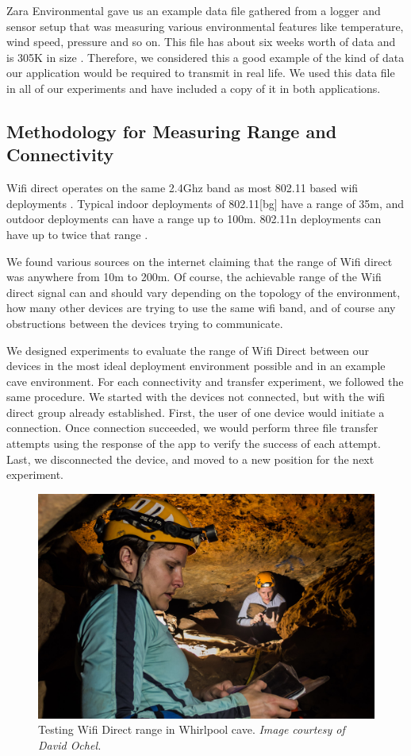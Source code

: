 \documentclass[10pt,twocolumn]{article}
\begin{document}
Zara Environmental gave us an example data file gathered from a logger and sensor setup that was measuring various environmental features like temperature, wind speed, pressure and so on.
This file has about six weeks worth of data and is 305K in size \cite{datafile}.
Therefore, we considered this a good example of the kind of data our application would be required to transmit in real life.
We used this data file in all of our experiments and have included a copy of it in both applications.

\subsection{Methodology for Measuring Range and Connectivity}
Wifi direct operates on the same 2.4Ghz band as most 802.11 based wifi deployments \cite{wifiwhitepaper}.
Typical indoor deployments of 802.11[bg] have a range of 35m, and outdoor deployments can have a range up to 100m.
802.11n deployments can have up to twice that range \cite{wikiwifi}.

We found various sources on the internet claiming that the range of Wifi direct was anywhere from 10m to 200m. 
Of course, the achievable range of the Wifi direct signal can and should vary depending on the topology of the environment, how many other devices are trying to use the same wifi band, and of course any obstructions between the devices trying to communicate.

We designed experiments to evaluate the range of Wifi Direct between our devices in the most ideal deployment environment possible and in an example cave environment.
For each connectivity and transfer experiment, we followed the same procedure. 
We started with the devices not connected, but with the wifi direct group already established.
First, the user of one device would initiate a connection.
Once connection succeeded, we would perform three file transfer attempts using the response of the app to verify the success of each attempt.
Last, we disconnected the device, and moved to a new position for the next experiment.

\begin{figure}
\includegraphics[width=\columnwidth]{cavewifi}
\caption{Testing Wifi Direct range in Whirlpool cave. \textit{Image courtesy of David Ochel.}}
\end{figure}
\end{document}
